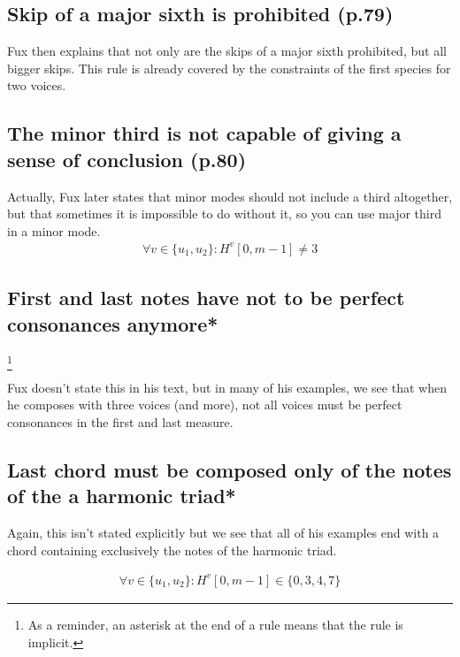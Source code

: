\subsection{\reddot Skip of a major sixth is prohibited (p.79)}
Fux then explains that not only are the skips of a major sixth prohibited, but all bigger skips. This rule is already covered by the constraints of the first species for two voices. 

\subsection{\reddot The minor third is not capable of giving a sense of conclusion (p.80)}
Actually, Fux later states that minor modes should not include a third altogether, but that sometimes it is impossible to do without it, so you can use major third in a minor mode.
\begin{equation} \begin{aligned}
\forall v \in \{u_1, u_2\} \colon H^{v}[0, m-1] \neq 3
\end{aligned} \end{equation}


\subsection{\reddot First and last notes have not to be perfect consonances anymore*} \label{rule:last-chord-not-perfect-anymore}
\footnote{As a reminder, an asterisk at the end of a rule means that the rule is implicit.}

Fux doesn't state this in his text, but in many of his examples, we see that when he composes with three voices (and more), not all voices must be perfect consonances in the first and last measure.

\subsection{\reddot Last chord must be composed only of the notes of the a harmonic triad*} \label{rule:last-chord-h-triad}
Again, this isn't stated explicitly but we see that all of his examples end with a chord containing exclusively the notes of the harmonic triad.

\begin{equation} \begin{aligned}
\forall v \in \{u_1, u_2\} \colon H^{v}[0, m-1] \in \{0, 3, 4, 7\}
\end{aligned} \end{equation}


